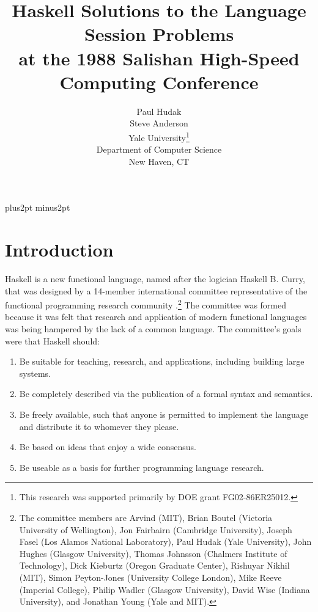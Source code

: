\textheight=8.0in
\textwidth=6.0in
\topmargin=0.5in
\oddsidemargin=0.5in
\evensidemargin=0.5in
\parskip=6pt plus2pt minus2pt

\newcommand{\lam}{\lambda}
\newcommand{\la}{\leftarrow}
\def\ab#1{\langle#1\rangle}


\title{Haskell Solutions to the Language Session Problems\\
at the 1988 Salishan High-Speed Computing Conference}
\author{Paul Hudak\\
Steve Anderson\\[.2in]
Yale University\thanks{This research was supported primarily by DOE grant FG02-86ER25012.}\\
Department of Computer Science\\
New Haven, CT}
\maketitle

\section{Introduction}

Haskell is a new functional language, named after the logician Haskell
B. Curry, that was designed by a 14-member international committee
representative of the functional programming research community
\cite{haskell}.\footnote{The committee members are Arvind (MIT), Brian
Boutel (Victoria University of Wellington), Jon Fairbairn (Cambridge
University), Joseph Fasel (Los Alamos National Laboratory), Paul Hudak
(Yale University), John Hughes (Glasgow University), Thomas Johnsson
(Chalmers Institute of Technology), Dick Kieburtz (Oregon Graduate
Center), Rishuyar Nikhil (MIT), Simon Peyton-Jones (University College
London), Mike Reeve (Imperial College), Philip Wadler (Glasgow
University), David Wise (Indiana University), and Jonathan Young (Yale
and MIT).} The committee was formed because it was felt that research
and application of modern functional languages was being hampered by
the lack of a common language.  The committee's goals were that
Haskell should:
\begin{enumerate}
\item Be suitable for teaching, research, and applications, including 
      building large systems.
\item Be completely described via the publication of a formal syntax 
      and semantics.
\item Be freely available, such that anyone is permitted to implement 
      the language and distribute it to whomever they please.
\item Be based on ideas that enjoy a wide consensus.  
\item Be useable as a basis for further programming language research.  
\end{enumerate}

